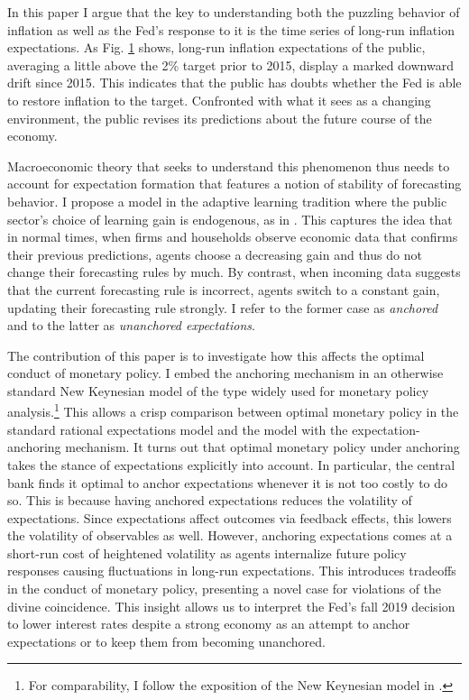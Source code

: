 \documentclass[11pt]{article}
\def \myFigPath {../../figures/}
\renewcommand{\[}{\begin{equation}}
\renewcommand{\]}{\end{equation}}
\def\mySmallFigScale{0.22}
\begin{document}
In this paper I argue that the key to understanding both the puzzling behavior of inflation as well as the Fed's response to it is the time series of long-run inflation expectations. As Fig. \ref{epi} shows, long-run inflation expectations of the public, averaging a little above the 2\% target prior to 2015, display a marked downward drift since 2015. This indicates that the public has doubts whether the Fed is able to restore inflation to the target. Confronted with what it sees as a changing environment, the public revises its predictions about the future course of the economy.

\begin{figure}[h!]
\caption{}
\label{epi}
\end{figure}

Macroeconomic theory that seeks to understand this phenomenon thus needs to account for expectation formation that features a notion of stability of forecasting behavior. I propose a model in the adaptive learning tradition where the public sector's choice of learning gain is endogenous, as in \cite{carvalho2019anchored}. This captures the idea that in normal times, when firms and households observe economic data that confirms their previous predictions, agents choose a decreasing gain and thus do not change their forecasting rules by much. By contrast, when incoming data suggests that the current forecasting rule is incorrect, agents switch to a constant gain, updating their forecasting rule strongly. I refer to the former case as \emph{anchored} and to the latter as \emph{unanchored expectations}.

The contribution of this paper is to investigate how this affects the optimal conduct of monetary policy. I embed the anchoring mechanism in an otherwise standard New Keynesian model of the type widely used for monetary policy analysis.\footnote{For comparability, I follow the exposition of the New Keynesian model in \cite{woodford2011interest}.} This allows a crisp comparison between optimal monetary policy in the standard rational expectations model and the model with the expectation-anchoring mechanism. It turns out that optimal monetary policy under anchoring takes the stance of expectations explicitly into account. In particular, the central bank finds it optimal to anchor expectations whenever it is not too costly to do so. This is because having anchored expectations reduces the volatility of expectations. Since expectations affect outcomes via feedback effects, this lowers the volatility of observables as well. However, anchoring expectations comes at a short-run cost of heightened volatility as agents internalize future policy responses causing fluctuations in long-run expectations. This introduces tradeoffs in the conduct of monetary policy, presenting a novel case for violations of the divine coincidence. This insight allows us to interpret the Fed's fall 2019 decision to lower interest rates despite a strong economy as an attempt to anchor expectations or to keep them from becoming unanchored. 
\end{document}

